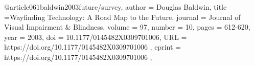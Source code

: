 @article{061baldwin2003future/survey,
author = {Douglas Baldwin},
title ={Wayfinding Technology: A Road Map to the Future},
journal = {Journal of Visual Impairment \& Blindness},
volume = {97},
number = {10},
pages = {612-620},
year = {2003},
doi = {10.1177/0145482X0309701006},
URL = { https://doi.org/10.1177/0145482X0309701006 },
eprint = { https://doi.org/10.1177/0145482X0309701006 },
}